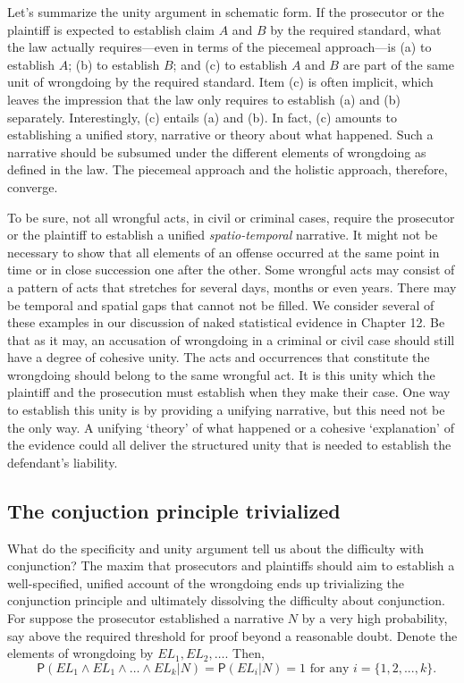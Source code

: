 \documentclass[
  10pt,
  dvipsnames,enabledeprecatedfontcommands]{scrartcl}
\newcommand{\pr}[1]{\ensuremath{\mathsf{P}(#1)}}
\begin{document}
Let's summarize the unity argument in schematic form. If the prosecutor
or the plaintiff is expected to establish claim \(A\) and \(B\) by the
required standard, what the law actually requires---even in terms of the
piecemeal approach---is (a) to establish \(A\); (b) to establish \(B\);
and (c) to establish \(A\) and \(B\) are part of the same unit of
wrongdoing by the required standard. Item (c) is often implicit, which
leaves the impression that the law only requires to establish (a) and
(b) separately. Interestingly, (c) entails (a) and (b). In fact, (c)
amounts to establishing a unified story, narrative or theory about what
happened. Such a narrative should be subsumed under the different
elements of wrongdoing as defined in the law. The piecemeal approach and
the holistic approach, therefore, converge.

To be sure, not all wrongful acts, in civil or criminal cases, require
the prosecutor or the plaintiff to establish a unified
\emph{spatio-temporal} narrative. It might not be necessary to show that
all elements of an offense occurred at the same point in time or in
close succession one after the other. Some wrongful acts may consist of
a pattern of acts that stretches for several days, months or even years.
There may be temporal and spatial gaps that cannot not be filled. We
consider several of these examples in our discussion of naked
statistical evidence in Chapter 12. Be that as it may, an accusation of
wrongdoing in a criminal or civil case should still have a degree of
cohesive unity. The acts and occurrences that constitute the wrongdoing
should belong to the same wrongful act. It is this unity which the
plaintiff and the prosecution must establish when they make their case.
One way to establish this unity is by providing a unifying narrative,
but this need not be the only way. A unifying `theory' of what happened
or a cohesive `explanation' of the evidence could all deliver the
structured unity that is needed to establish the defendant's liability.

\hypertarget{the-conjuction-principle-trivialized}{%
\subsection{The conjuction principle
trivialized}\label{the-conjuction-principle-trivialized}}

What do the specificity and unity argument tell us about the difficulty
with conjunction? The maxim that prosecutors and plaintiffs should aim
to establish a well-specified, unified account of the wrongdoing ends up
trivializing the conjunction principle and ultimately dissolving the
difficulty about conjunction. For suppose the prosecutor established a
narrative \(N\) by a very high probability, say above the required
threshold for proof beyond a reasonable doubt. Denote the elements of
wrongdoing by \(EL_1, EL_2, \dots\). Then,
\[\text{ $\pr{EL_1\wedge EL_1 \wedge \dots \wedge EL_k \vert N}=\pr{EL_i \vert N} = 1$ for any $i=\{1, 2, ..., k\}$}.\]
\noindent
\end{document}

